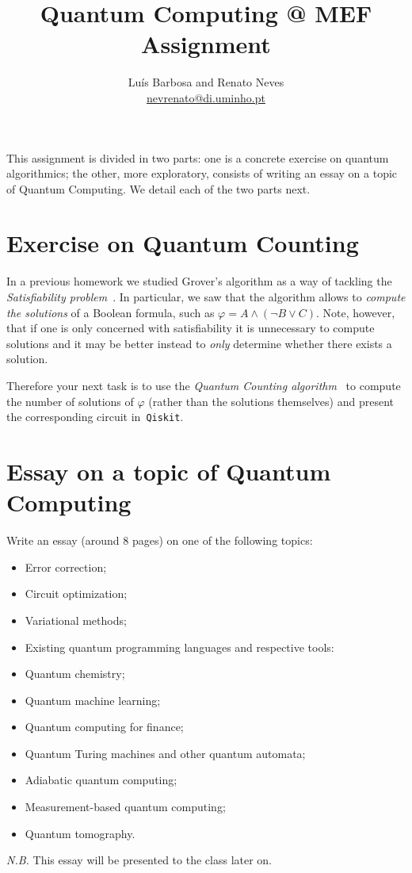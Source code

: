 \documentclass[a4paper, 11pt]{article}
\date{}
\theoremstyle{definition}
\begin{document}
\allowdisplaybreaks[2]
\title{Quantum Computing @ MEF \\ \small{Assignment}}
\author{Luís Barbosa and Renato Neves \\ \scriptsize
  \href{mailto:nevrenato@di.uminho.pt}{nevrenato@di.uminho.pt}}
\maketitle

\noindent
This assignment is divided in two parts: one is a concrete exercise on
quantum algorithmics; the other, more exploratory, consists of writing
an essay on a topic of Quantum Computing. We detail each of the two
parts next.

\section{Exercise on Quantum Counting}

\noindent
In a previous homework we studied Grover's algorithm as a way of
tackling the \emph{Satisfiability problem}~\cite{schoning13}. In
particular, we saw that the algorithm allows to \emph{compute the
  solutions} of a Boolean formula, such as
$\varphi = A \wedge (\neg B \vee C)$. Note, however, that if one is
only concerned with satisfiability it is unnecessary to compute
solutions and it may be better instead to \emph{only} determine
whether there exists a solution.

Therefore your next task is to use the \emph{Quantum Counting
  algorithm}~\cite{nielsen16} to compute the number of solutions of
$\varphi$ (rather than the solutions themselves) and present the
corresponding circuit in~\texttt{Qiskit}.


\section{Essay on a topic of Quantum Computing}

Write an essay (around 8 pages) on one of the following topics:
\begin{itemize}
\item Error correction;
\item Circuit optimization;
\item Variational methods;
\item Existing quantum programming languages and respective tools:
\item Quantum chemistry;
\item Quantum machine learning;
\item Quantum computing for finance;
\item Quantum Turing machines and other quantum automata;
\item Adiabatic quantum computing;
\item Measurement-based quantum computing;
\item Quantum tomography.  
\end{itemize}
\emph{N.B.} This essay will be presented to the class later on.
\end{document}
